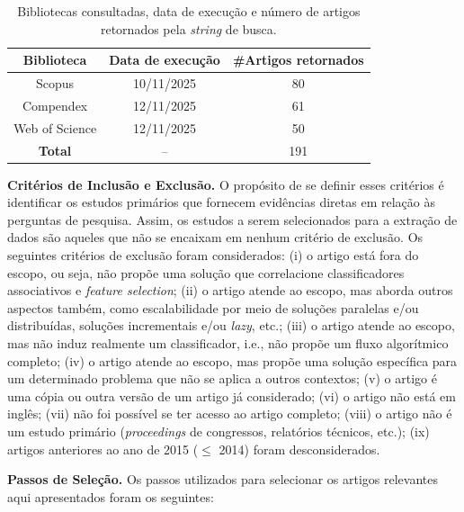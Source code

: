 \begin{table}[htbp]
\centering
\caption{Bibliotecas consultadas, data de execução e número de artigos retornados pela \textit{string} de busca.}
\label{tab:fontes_busca}
\renewcommand{\arraystretch}{1.2}
\begin{tabular}{|c|c|c|}
\hline
\textbf{Biblioteca} & \textbf{Data de execução} & \textbf{\#Artigos retornados} \\
\hline
Scopus & 10/11/2025 & 80 \\
Compendex & 12/11/2025 & 61 \\
Web of Science & 12/11/2025 & 50 \\
\hline
\textbf{Total} & -- & 191 \\
\hline
\end{tabular}
\end{table}


\textbf{Critérios de Inclusão e Exclusão.} O propósito de se definir esses critérios é identificar os estudos primários que fornecem evidências diretas em relação às perguntas de pesquisa. Assim, os estudos a serem selecionados para a extração de dados são aqueles que não se encaixam em nenhum critério de exclusão. Os seguintes critérios de exclusão foram considerados: (i) o artigo está fora do escopo, ou seja, não propõe uma solução que correlacione classificadores associativos e \textit{feature selection}; (ii) o artigo atende ao escopo, mas aborda outros aspectos também, como escalabilidade por meio de soluções paralelas e/ou distribuídas, soluções incrementais e/ou \textit{lazy}, etc.; (iii) o artigo atende ao escopo, mas não induz realmente um classificador, i.e., não propõe um fluxo algorítmico completo; (iv) o artigo atende ao escopo, mas propõe uma solução específica para um determinado problema que não se aplica a outros contextos; (v) o artigo é uma cópia ou outra versão de um artigo já considerado; (vi) o artigo não está em inglês; (vii) não foi possível se ter acesso ao artigo completo; (viii) o artigo não é um estudo primário (\textit{proceedings} de congressos, relatórios técnicos, etc.); (ix) artigos anteriores ao ano de 2015 ($\leq$ 2014) foram desconsiderados.


\textbf{Passos de Seleção.} Os passos utilizados para selecionar os artigos relevantes aqui apresentados foram os seguintes:


